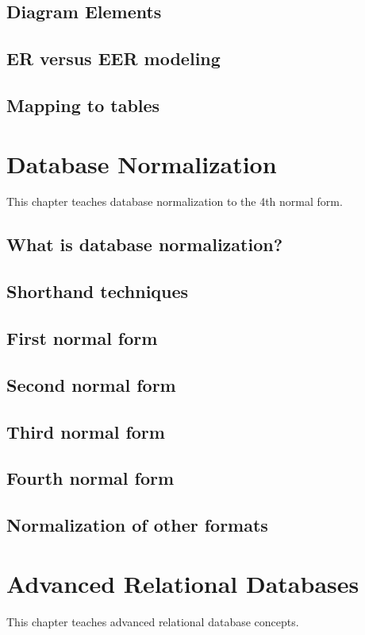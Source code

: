 \section{Diagram Elements}
\section{ER versus EER modeling}
\section{Mapping to tables}

\chapter{Database Normalization}
\label{chap:relational:database-normalization}
This chapter teaches database normalization to the 4th normal form.

\section{What is database normalization?}
\section{Shorthand techniques}
\section{First normal form}
\section{Second normal form}
\section{Third normal form}
\section{Fourth normal form}
\section{Normalization of other formats}

\chapter{Advanced Relational Databases}
\label{chap:relational:advanced-relational-databases}
This chapter teaches advanced relational database concepts.

